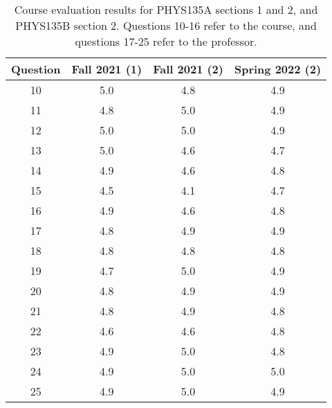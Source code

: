 \documentclass[../../main.tex]{subfiles}
\begin{document}
\begin{table}
\scriptsize
\centering
\begin{tabular}{| c | c | c | c |}
\hline
\hline
Question & Fall 2021 (1) & Fall 2021 (2) & Spring 2022 (2) \\ \hline
10 & 5.0 & 4.8 & 4.9 \\ \hline
11 & 4.8 & 5.0 & 4.9 \\ \hline
12 & 5.0 & 5.0 & 4.9 \\ \hline
13 & 5.0 & 4.6 & 4.7 \\ \hline
14 & 4.9 & 4.6 & 4.8 \\ \hline
15 & 4.5 & 4.1 & 4.7 \\ \hline
16 & 4.9 & 4.6 & 4.8 \\ \hline
17 & 4.8 & 4.9 & 4.9 \\ \hline
18 & 4.8 & 4.8 & 4.8 \\ \hline
19 & 4.7 & 5.0 & 4.9 \\ \hline
20 & 4.8 & 4.9 & 4.9 \\ \hline
21 & 4.8 & 4.9 & 4.8 \\ \hline
22 & 4.6 & 4.6 & 4.8 \\ \hline
23 & 4.9 & 5.0 & 4.8 \\ \hline
24 & 4.9 & 5.0 & 5.0 \\ \hline
25 & 4.9 & 5.0 & 4.9 \\ \hline
\hline
\end{tabular}
\caption{\label{tab:eval_135} Course evaluation results for PHYS135A sections 1 and 2, and PHYS135B section 2.  Questions 10-16 refer to the course, and questions 17-25 refer to the professor.}
\end{table}
\end{document}
